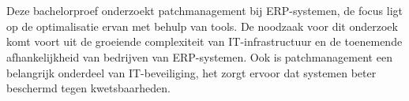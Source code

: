 
%
%
%
%
%

%



\chapter*{}


Deze bachelorproef onderzoekt patchmanagement bij ERP-systemen, de focus ligt op de optimalisatie ervan met behulp van tools. De noodzaak voor dit onderzoek komt voort uit de groeiende complexiteit van IT-infrastructuur en de toenemende afhankelijkheid van bedrijven van ERP-systemen. Ook is patchmanagement een belangrijk onderdeel van IT-beveiliging, het zorgt ervoor dat systemen beter beschermd tegen kwetsbaarheden.

